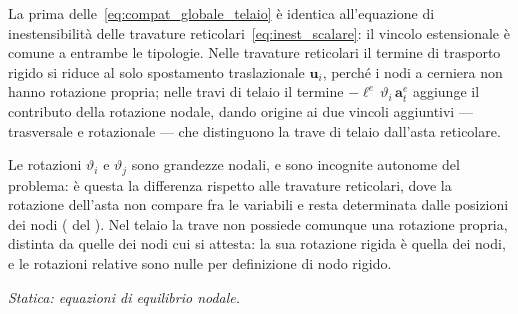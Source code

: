 \begin{oss}
	La prima delle~\eqref{eq:compat_globale_telaio}
	è identica all'equazione di inestensibilità delle
	travature reticolari~\eqref{eq:inest_scalare}:
	il vincolo estensionale è comune a entrambe le
	tipologie. Nelle travature reticolari il termine
	di trasporto rigido si riduce al solo spostamento
	traslazionale $\mathbf{u}_i$, perché i nodi a
	cerniera non hanno rotazione propria; nelle travi
	di telaio il termine $-\ell^e\,\vartheta_i\,\mathbf{a}^e_t$
	aggiunge il contributo della rotazione nodale,
	dando origine ai due vincoli aggiuntivi ---
	trasversale e rotazionale --- che distinguono
	la trave di telaio dall'asta reticolare.
	
	Le rotazioni $\vartheta_i$ e $\vartheta_j$ sono
	grandezze nodali, e sono incognite autonome del
	problema: è questa la differenza rispetto alle
	travature reticolari, dove la rotazione dell'asta
	non compare fra le variabili e resta determinata
	dalle posizioni dei nodi
	( del
	). Nel telaio la trave non
	possiede comunque una rotazione propria, distinta
	da quelle dei nodi cui si attesta: la sua rotazione
	rigida è quella dei nodi, e le rotazioni relative
	sono nulle per definizione di nodo rigido.
\end{oss}








\medskip
\noindent\textit{Statica: equazioni di equilibrio nodale.}
\label{subpar:statica_telai}

